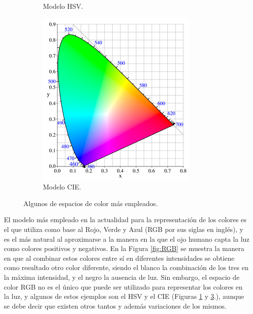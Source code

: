 \begin{figure}[htbp!]
\begin{subfigure}[h]{0.25\textwidth}
		\caption{Modelo HSV.}
		\label{fig:HSV}
	\end{subfigure}
	\begin{subfigure}[h]{0.25\textwidth}
		\includegraphics[width=\textwidth]{./Figuras/CIE}
		\caption{Modelo CIE.}
		\label{fig:CIE}
	\end{subfigure}
	\caption{Algunos de espacios de color más empleados.}
\end{figure}
\par El modelo más empleado en la actualidad para la representación de los colores es el que utiliza como base al Rojo, Verde y Azul (RGB por sus siglas en inglés), y es el más natural al aproximarse a la manera en la que el ojo humano capta la luz como colores positivos y negativos. En la Figura \ref{fig:RGB} se muestra la manera en que al combinar estos colores entre sí en diferentes intensidades se obtiene como resultado otro color diferente, siendo el blanco la combinación de los tres en la máxima intensidad, y el negro la ausencia de luz. Sin embargo, el espacio de color RGB no es el único que puede ser utilizado para representar los colores en la luz, y algunos de estos ejemplos son el HSV y el CIE (Figuras \ref{fig:HSV} y \ref{fig:CIE}.), aunque se debe decir que existen otros tantos y además variaciones de los mismos.
